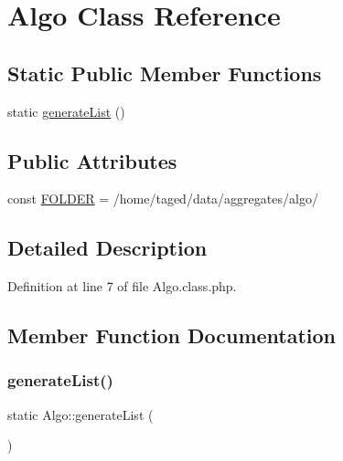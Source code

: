 \hypertarget{class_algo}{}\section{Algo Class Reference}
\label{class_algo}
\subsection*{Static Public Member Functions}
\begin{DoxyCompactItemize}
\item 
static \hyperlink{class_algo_a81c78bf526eab5de7d40d1abdb59557a}{generate\+List} ()
\end{DoxyCompactItemize}
\subsection*{Public Attributes}
\begin{DoxyCompactItemize}
\item 
const \hyperlink{class_algo_a0e30fd4650669b4df832624da8a85968}{F\+O\+L\+D\+ER} = \textquotesingle{}/home/taged/data/aggregates/algo/\textquotesingle{}
\end{DoxyCompactItemize}


\subsection{Detailed Description}


Definition at line 7 of file Algo.\+class.\+php.



\subsection{Member Function Documentation}
\mbox{\label{class_algo_a81c78bf526eab5de7d40d1abdb59557a}} 
\subsubsection{\texorpdfstring{generate\+List()}{generateList()}}
{\footnotesize\ttfamily static Algo\+::generate\+List (\begin{DoxyParamCaption}{ }\end{DoxyParamCaption})\hspace{0.3cm}{\ttfamily [static]}}

